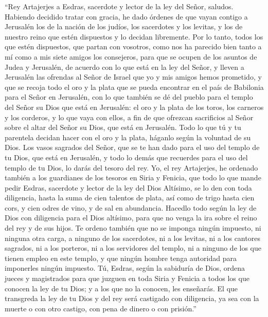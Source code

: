  ``Rey Artajerjes a Esdras, sacerdote y lector de la ley
del Señor, saludos.  Habiendo decidido tratar con gracia,
he dado órdenes de que vayan contigo a Jerusalén los de la nación de los
judíos, los sacerdotes y los levitas, y los de nuestro reino que estén
dispuestos y lo decidan libremente.  Por lo tanto, todos
los que estén dispuestos, que partan con vosotros, como nos ha parecido
bien tanto a mí como a mis siete amigos los consejeros, 
para que se ocupen de los asuntos de Judea y Jerusalén, de acuerdo con
lo que está en la ley del Señor,  y lleven a Jerusalén
las ofrendas al Señor de Israel que yo y mis amigos hemos prometido, y
que se recoja todo el oro y la plata que se pueda encontrar en el país
de Babilonia para el Señor en Jerusalén,  con lo que
también se dé del pueblo para el templo del Señor su Dios que está en
Jerusalén: el oro y la plata de los toros, los carneros y los corderos,
y lo que vaya con ellos,  a fin de que ofrezcan
sacrificios al Señor sobre el altar del Señor su Dios, que está en
Jerusalén.  Todo lo que tú y tu parentela decidan hacer
con el oro y la plata, háganlo según la voluntad de su Dios.
 Los vasos sagrados del Señor, que se te han dado para el
uso del templo de tu Dios, que está en Jerusalén,  y todo
lo demás que recuerdes para el uso del templo de tu Dios, lo darás del
tesoro del rey.  Yo, el rey Artajerjes, he ordenado
también a los guardianes de los tesoros en Siria y Fenicia, que todo lo
que mande pedir Esdras, sacerdote y lector de la ley del Dios Altísimo,
se lo den con toda diligencia,  hasta la suma de cien
talentos de plata, así como de trigo hasta cien cors, y cien odres de
vino, y de sal en abundancia.  Hacedlo todo según la ley
de Dios con diligencia para el Dios altísimo, para que no venga la ira
sobre el reino del rey y de sus hijos.  Te ordeno también
que no se imponga ningún impuesto, ni ninguna otra carga, a ninguno de
los sacerdotes, ni a los levitas, ni a los cantores sagrados, ni a los
porteros, ni a los servidores del templo, ni a ninguno de los que tienen
empleo en este templo, y que ningún hombre tenga autoridad para
imponerles ningún impuesto.  Tú, Esdras, según la
sabiduría de Dios, ordena jueces y magistrados para que juzguen en toda
Siria y Fenicia a todos los que conocen la ley de tu Dios; y a los que
no la conocen, les enseñarás.  El que transgreda la ley
de tu Dios y del rey será castigado con diligencia, ya sea con la muerte
o con otro castigo, con pena de dinero o con prisión.''

